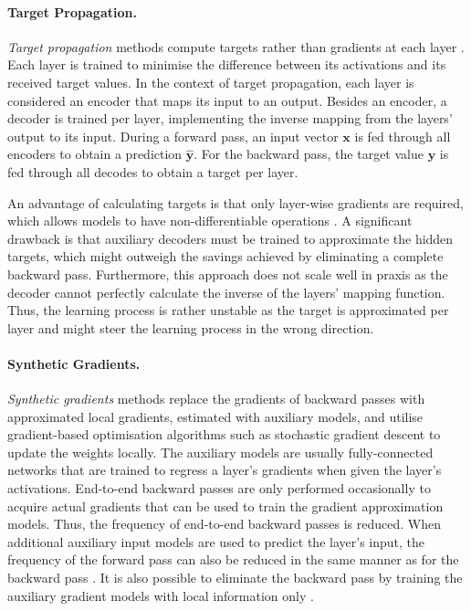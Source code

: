 \paragraph{Target Propagation.} \emph{Target propagation} methods compute targets rather than gradients at each layer .
Each layer is trained to minimise the difference between its activations and its received target values.
In the context of target propagation, each layer is considered an encoder that maps its input to an output. Besides an encoder, a decoder is trained per layer, implementing the inverse mapping from the layers' output to its input.
During a forward pass, an input vector $\boldsymbol{x}$ is fed through all encoders to obtain a prediction $\boldsymbol{\hat{y}}$. For the backward pass, the target value $\boldsymbol{y}$ is fed through all decodes to obtain a target per layer.


An advantage of calculating targets is that only layer-wise gradients are required, which allows models to have non-differentiable operations \cite{Lee_Zhang_Fischer_Bengio_2015}.
A significant drawback is that auxiliary decoders must be trained to approximate the hidden targets, which might outweigh the savings achieved by eliminating a complete backward pass.
Furthermore, this approach does not scale well in praxis as the decoder cannot perfectly calculate the inverse of the layers' mapping function. 
Thus, the learning process is rather unstable as the target is approximated per layer and might steer the learning process in the wrong direction.







\paragraph{Synthetic Gradients.} \emph{Synthetic gradients} methods  replace the gradients of backward passes with approximated local gradients, estimated with auxiliary models, and utilise gradient-based optimisation algorithms such as stochastic gradient descent to update the weights locally.
The auxiliary models are usually fully-connected networks that are trained to regress a layer's gradients when given the layer's activations.
End-to-end backward passes are only performed occasionally to acquire actual gradients that can be used to train the gradient approximation models.
Thus, the frequency of end-to-end backward passes is reduced.
When additional auxiliary input models are used to predict the layer's input, the frequency of the forward pass can also be reduced in the same manner as for the backward pass \cite{jaderberg_decoupled_2017}.
It is also possible to eliminate the backward pass by training the auxiliary gradient models with local information only .

